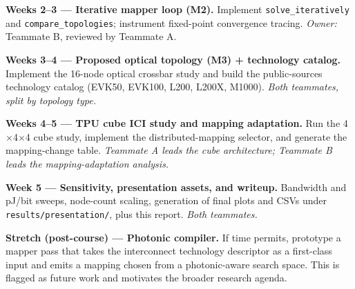\documentclass[conference,onecolumn]{IEEEtran}
\begin{document}
\textbf{Weeks 2--3 --- Iterative mapper loop (M2).}
Implement \texttt{solve\_iteratively} and \texttt{compare\_topologies};
instrument fixed-point convergence tracing. \emph{Owner:} Teammate B,
reviewed by Teammate A.

\textbf{Weeks 3--4 --- Proposed optical topology (M3) + technology catalog.}
Implement the 16-node optical crossbar study and build the public-sources
technology catalog (EVK50, EVK100, L200, L200X, M1000). \emph{Both teammates,
split by topology type.}

\textbf{Weeks 4--5 --- TPU cube ICI study and mapping adaptation.}
Run the 4$\times$4$\times$4 cube study, implement the distributed-mapping
selector, and generate the mapping-change table. \emph{Teammate A leads the
cube architecture; Teammate B leads the mapping-adaptation analysis.}

\textbf{Week 5 --- Sensitivity, presentation assets, and writeup.}
Bandwidth and pJ/bit sweeps, node-count scaling, generation of final plots
and CSVs under \texttt{results/presentation/}, plus this report. \emph{Both
teammates.}

\textbf{Stretch (post-course) --- Photonic compiler.}
If time permits, prototype a mapper pass that takes the interconnect
technology descriptor as a first-class input and emits a mapping chosen from
a photonic-aware search space. This is flagged as future work and motivates
the broader research agenda.
\end{document}
